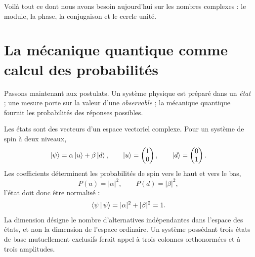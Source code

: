 \begin{classroomqa}
\end{classroomqa}

Voilà tout ce dont nous avons besoin aujourd’hui sur les nombres complexes : le module, la phase, la conjugaison et le cercle unité.

\section{La mécanique quantique comme calcul des probabilités}

Passons maintenant aux postulats. Un système physique est préparé dans un \emph{état} ; une mesure porte sur la valeur d’une \emph{observable} ; la mécanique quantique fournit les probabilités des réponses possibles.

Les états sont des vecteurs d’un espace vectoriel complexe. Pour un système de spin à deux niveaux,
\begin{equation}
  \left\lvert\psi\right\rangle=\alpha\left\lvert u\right\rangle+\beta\left\lvert d\right\rangle,
  \qquad
  \left\lvert u\right\rangle=\begin{pmatrix}1\\0\end{pmatrix},
  \qquad
  \left\lvert d\right\rangle=\begin{pmatrix}0\\1\end{pmatrix}.
  \label{eq:l03-two-level-state}
\end{equation}
Les coefficients déterminent les probabilités de spin vers le haut et vers le bas,
\begin{equation}
  P(u)=|\alpha|^2,
  \qquad
  P(d)=|\beta|^2,
\end{equation}
l’état doit donc être normalisé :
\begin{equation}
  \left\langle\psi\,\middle|\,\psi\right\rangle
  =|\alpha|^2+|\beta|^2
  =1.
  \label{eq:l03-state-normalization}
\end{equation}
La dimension désigne le nombre d’alternatives indépendantes dans l’espace des états, et non la dimension de l’espace ordinaire. Un système possédant trois états de base mutuellement exclusifs ferait appel à trois colonnes orthonormées et à trois amplitudes.

